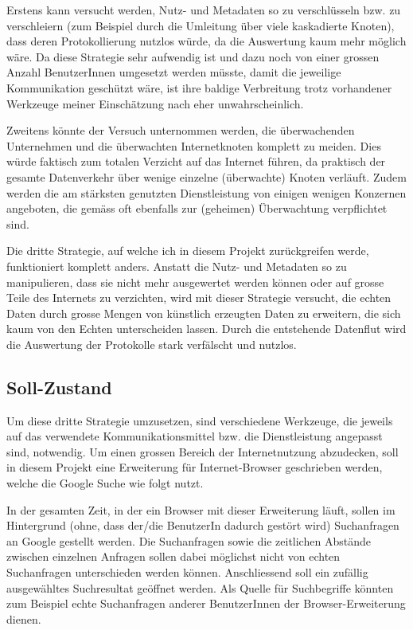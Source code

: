 Erstens kann versucht werden, Nutz- und Metadaten so zu verschlüsseln bzw. zu
verschleiern (zum Beispiel durch die Umleitung über viele kaskadierte Knoten),
dass deren Protokollierung nutzlos würde, da die Auswertung kaum mehr möglich
wäre. Da diese Strategie sehr aufwendig ist und dazu noch von einer grossen
Anzahl BenutzerInnen umgesetzt werden müsste, damit die jeweilige Kommunikation
geschützt wäre, ist ihre baldige Verbreitung trotz vorhandener Werkzeuge meiner
Einschätzung nach eher unwahrscheinlich.

Zweitens könnte der Versuch unternommen werden, die überwachenden Unternehmen
und die überwachten Internetknoten komplett zu meiden. Dies würde faktisch zum
totalen Verzicht auf das Internet führen, da praktisch der gesamte Datenverkehr
über wenige einzelne (überwachte) Knoten verläuft. Zudem werden die am stärksten
genutzten Dienstleistung von einigen wenigen Konzernen angeboten, die gemäss
\cite{snowden:nsa} oft ebenfalls zur (geheimen) Überwachtung verpflichtet sind.

Die dritte Strategie, auf welche ich in diesem Projekt zurückgreifen werde,
funktioniert komplett anders. Anstatt die Nutz- und Metadaten so zu
manipulieren, dass sie nicht mehr ausgewertet werden können oder auf grosse
Teile des Internets zu verzichten, wird mit dieser Strategie versucht, die
echten Daten durch grosse Mengen von künstlich erzeugten Daten zu erweitern, die
sich kaum von den Echten unterscheiden lassen. Durch die entstehende Datenflut
wird die Auswertung der Protokolle stark verfälscht und nutzlos.

\subsection{Soll-Zustand}

Um diese dritte Strategie umzusetzen, sind verschiedene Werkzeuge, die jeweils
auf das verwendete Kommunikationsmittel bzw. die Dienstleistung angepasst sind,
notwendig. Um einen grossen Bereich der Internetnutzung abzudecken, soll in
diesem Projekt eine Erweiterung für Internet-Browser geschrieben werden, welche
die Google Suche wie folgt nutzt.

In der gesamten Zeit, in der ein Browser mit dieser Erweiterung läuft, sollen im
Hintergrund (ohne, dass der/die BenutzerIn dadurch gestört wird) Suchanfragen an
Google gestellt werden. Die Suchanfragen sowie die zeitlichen Abstände zwischen
einzelnen Anfragen sollen dabei möglichst nicht von echten Suchanfragen
unterschieden werden können. Anschliessend soll ein zufällig ausgewähltes
Suchresultat geöffnet werden. Als Quelle für Suchbegriffe könnten zum Beispiel
echte Suchanfragen anderer BenutzerInnen der Browser-Erweiterung dienen.

